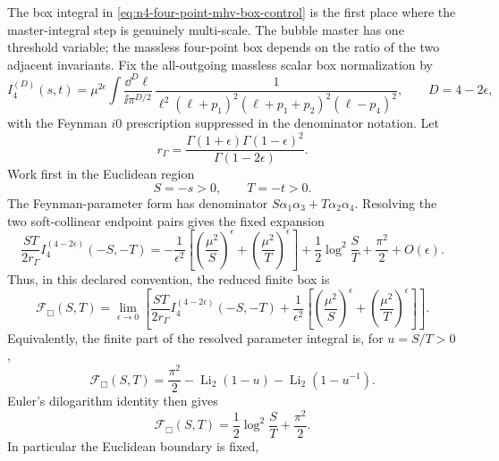 The box integral in \eqref{eq:n4-four-point-mhv-box-control} is the first
place where the master-integral step is genuinely multi-scale.  The bubble
master has one threshold variable; the massless four-point box depends on the
ratio of the two adjacent invariants.  Fix the all-outgoing massless scalar box
normalization by
\begin{equation}
  I_4^{(D)}(s,t)
  =
  \mu^{2\epsilon}
  \int\frac{\dd^D\ell}{\ii\pi^{D/2}}\,
  \frac1{
    \ell^2
    (\ell+p_1)^2
    (\ell+p_1+p_2)^2
    (\ell-p_4)^2
  },
  \qquad D=4-2\epsilon ,
  \label{eq:massless-scalar-box-normalization}
\end{equation}
with the Feynman \(i0\) prescription suppressed in the denominator notation.
Let
\[
  r_\Gamma
  =
  \frac{\Gamma(1+\epsilon)\Gamma(1-\epsilon)^2}{\Gamma(1-2\epsilon)} .
\]
Work first in the Euclidean region
\[
  S=-s>0,\qquad T=-t>0 .
\]
The Feynman-parameter form has denominator
\(S\alpha_1\alpha_3+T\alpha_2\alpha_4\).  Resolving the two soft-collinear
endpoint pairs gives the fixed expansion
\begin{equation}
  \frac{S T}{2r_\Gamma}I_4^{(4-2\epsilon)}(-S,-T)
  =
  -\frac1{\epsilon^2}
  \left[
    \left(\frac{\mu^2}{S}\right)^\epsilon
    +
    \left(\frac{\mu^2}{T}\right)^\epsilon
  \right]
  +
  \frac12\log^2\frac{S}{T}
  +
  \frac{\pi^2}{2}
  +O(\epsilon).
  \label{eq:massless-scalar-box-euclidean-expansion}
\end{equation}
Thus, in this declared convention, the reduced finite box is
\begin{equation}
  \mathcal F_{\Box}(S,T)
  =
  \lim_{\epsilon\to0}
  \left[
    \frac{S T}{2r_\Gamma}I_4^{(4-2\epsilon)}(-S,-T)
    +
    \frac1{\epsilon^2}
    \left[
      \left(\frac{\mu^2}{S}\right)^\epsilon
      +
      \left(\frac{\mu^2}{T}\right)^\epsilon
    \right]
  \right].
  \label{eq:finite-reduced-box-definition}
\end{equation}
Equivalently, the finite part of the resolved parameter integral is, for
\(u=S/T>0\),
\begin{equation}
  \mathcal F_{\Box}(S,T)
  =
  \frac{\pi^2}{2}
  -\operatorname{Li}_2(1-u)
  -\operatorname{Li}_2(1-u^{-1}) .
  \label{eq:finite-box-dilog-parameter-output}
\end{equation}
Euler's dilogarithm identity then gives
\begin{equation}
  \mathcal F_{\Box}(S,T)
  =
  \frac12\log^2\frac{S}{T}
  +
  \frac{\pi^2}{2}.
  \label{eq:finite-box-solution}
\end{equation}
In particular the Euclidean boundary is fixed,
